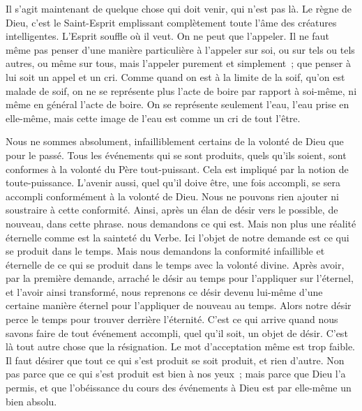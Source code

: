 \documentclass[french,twoside]{book} %
\newenvironment{quoteblock}%
  {\begin{quoting}}
  {\end{quoting}}
\newenvironment{quotebar}{%
    \def\FrameCommand{{\color{rubric!10!}\vrule width 0.5em} \hspace{0.9em}}%
    \def\OuterFrameSep{\itemsep} %
    \MakeFramed {\advance\hsize-\width \FrameRestore}
  }%
  {%
    \endMakeFramed
  }
\renewenvironment{quoteblock}%
  {%
    \savenotes
    \setstretch{0.9}
    \normalfont
    \begin{quotebar}
  }
  {%
    \end{quotebar}
    \spewnotes
  }
\begin{document}
\begin{quoteblock}
 \end{quoteblock}

\noindent Il s'agit maintenant de quelque chose qui doit venir, qui n'est pas là. Le règne de Dieu, c'est le Saint-Esprit emplissant complètement toute l'âme des créatures intelligentes. L'Esprit souffle où il veut. On ne peut que l'appeler. Il ne faut même pas penser d'une manière particulière à l'appeler sur soi, ou sur tels ou tels autres, ou même sur tous, mais l'appeler purement et simplement ; que penser à lui soit un appel et un cri. Comme quand on est à la limite de la soif, qu'on est malade de soif, on ne se représente plus l'acte de boire par rapport à soi-même, ni même en général l'acte de boire. On se représente seulement l'eau, l'eau prise en elle-même, mais cette image de l'eau est comme un cri de tout l'être.\par

\begin{quoteblock}
 \end{quoteblock}

\noindent Nous ne sommes absolument, infailliblement certains de la volonté de Dieu que pour le passé. Tous les événements qui se sont produits, quels qu'ils soient, sont conformes à la volonté du Père tout-puissant. Cela est impliqué par la notion de toute-puissance. L'avenir aussi, quel qu'il doive être, une fois accompli, se sera accompli conformément à la volonté de Dieu. Nous ne pouvons rien ajouter ni soustraire à cette conformité. Ainsi, après un élan de désir vers le possible, de nouveau, dans cette phrase. nous demandons ce qui est. Mais non plus une réalité éternelle comme est la sainteté du Verbe. Ici l'objet de notre demande est ce qui se produit dans le temps. Mais nous demandons la conformité infaillible et éternelle de ce qui se produit dans le temps avec la volonté divine. Après avoir, par la première demande, arraché le désir au temps pour l'appliquer sur l'éternel, et l'avoir ainsi transformé, nous reprenons ce désir devenu lui-même d'une certaine manière éternel pour l'appliquer de nouveau au temps. Alors notre désir perce le temps pour trouver derrière l'éternité. C'est ce qui arrive quand nous savons faire de tout événement accompli, quel qu'il soit, un objet de désir. C'est là tout autre chose que la résignation. Le mot d'acceptation même est trop faible. Il faut désirer que tout ce qui s'est produit se soit produit, et rien d'autre. Non pas parce que ce qui s'est produit est bien à nos yeux ; mais parce que Dieu l'a permis, et que l'obéissance du cours des événements à Dieu est par elle-même un bien absolu.\par
\end{document}
